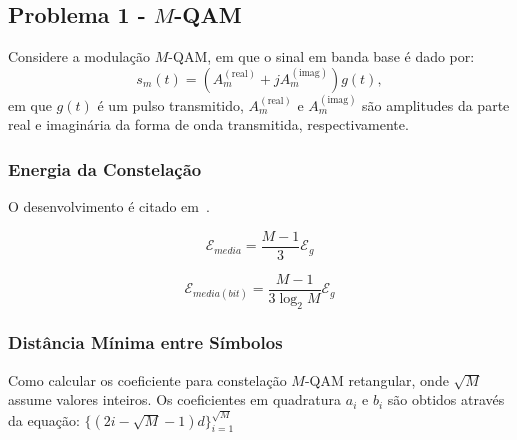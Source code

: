 \subsection{Problema 1 - \texorpdfstring{$M$}{M}-QAM}

Considere a modulação $M$-QAM, em que o sinal em banda base é dado por:
$$s_m(t) = ( A_m^{(\text{real})} + j A_m^{(\text{imag})}) g(t) ,$$
em que $g(t)$ é um pulso transmitido, $A_m^{(\text{real})}$ e $A_m^{(\text{imag})}$ são amplitudes da parte real e imaginária da forma de onda transmitida, respectivamente.



\subsubsection{Energia da Constelação} 

O desenvolvimento é citado em~\cite{Proakis, Cecilio}.

$$ \mathcal{E}_{media} = \frac{M-1}{3} \mathcal{E}_g$$

$$ \mathcal{E}_{media(bit)} = \frac{M-1}{3\log_2 M} \mathcal{E}_g $$
\subsubsection{Distância Mínima entre Símbolos}

Como calcular os coeficiente para constelação $M$-QAM retangular, onde $\sqrt{M}$ assume valores inteiros. Os coeficientes em quadratura $a_i$ e $b_i$ são obtidos através da equação: $\{ (2i -\sqrt{M} - 1)d \}_{i=1}^{\sqrt{M}} $ 

